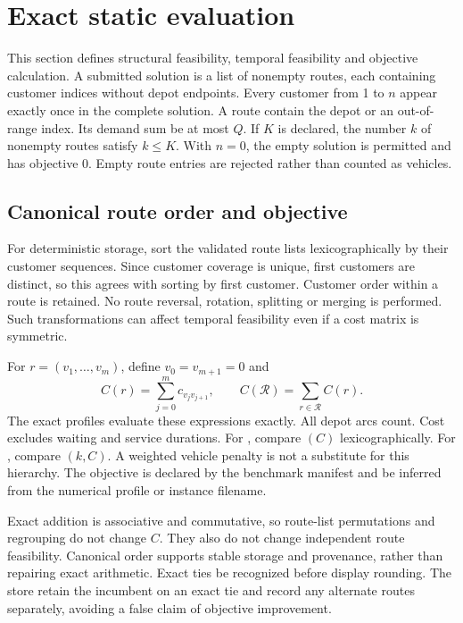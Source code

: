 \section{Exact static evaluation}\label{sec:exact}
This section defines structural feasibility, temporal feasibility and objective calculation. A submitted solution is a list of nonempty routes, each containing customer indices without depot endpoints. Every customer from 1 to $n$ \must{} appear exactly once in the complete solution. A route \mustnot{} contain the depot or an out-of-range index. Its demand sum \must{} be at most $Q$. If $K$ is declared, the number $k$ of nonempty routes \must{} satisfy $k\leq K$. With $n=0$, the empty solution is permitted and has objective 0. Empty route entries are rejected rather than counted as vehicles.

\subsection{Canonical route order and objective}
For deterministic storage, sort the validated route lists lexicographically by their customer sequences. Since customer coverage is unique, first customers are distinct, so this agrees with sorting by first customer. Customer order within a route is retained. No route reversal, rotation, splitting or merging is performed. Such transformations can affect temporal feasibility even if a cost matrix is symmetric.

For $r=(v_1,\ldots,v_m)$, define $v_0=v_{m+1}=0$ and
\[
C(r)=\sum_{j=0}^{m}c_{v_jv_{j+1}},\qquad C(\mathcal R)=\sum_{r\in\mathcal R}C(r).
\]
The exact profiles evaluate these expressions exactly. All depot arcs count. Cost excludes waiting and service durations. For , compare $(C)$ lexicographically. For , compare $(k,C)$. A weighted vehicle penalty is not a substitute for this hierarchy. The objective is declared by the benchmark manifest and \mustnot{} be inferred from the numerical profile or instance filename.

Exact addition is associative and commutative, so route-list permutations and regrouping do not change $C$. They also do not change independent route feasibility. Canonical order supports stable storage and provenance, rather than repairing exact arithmetic. Exact ties \must{} be recognized before display rounding. The store \should{} retain the incumbent on an exact tie and record any alternate routes separately, avoiding a false claim of objective improvement.

